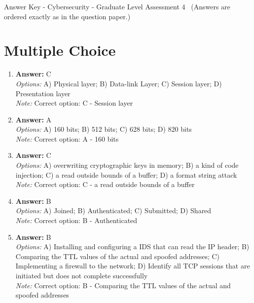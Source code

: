 \documentclass[12pt]{article}
\begin{document}
\begin{center}
Answer Key - Cybersecurity - Graduate Level Assessment 4 \
\small (Answers are ordered exactly as in the question paper.)
\end{center}

\section*{Multiple Choice}
\begin{enumerate}[label=\arabic*.]
\item \textbf{Answer:} C
\\ \textit{Options:} A) Physical layer; B) Data-link Layer; C) Session layer; D) Presentation layer
\\ \textit{Note:} Correct option: C - Session layer
\item \textbf{Answer:} A
\\ \textit{Options:} A) 160 bits; B) 512 bits; C) 628 bits; D) 820 bits
\\ \textit{Note:} Correct option: A - 160 bits
\item \textbf{Answer:} C
\\ \textit{Options:} A) overwriting cryptographic keys in memory; B) a kind of code injection; C) a read outside bounds of a buffer; D) a format string attack
\\ \textit{Note:} Correct option: C - a read outside bounds of a buffer
\item \textbf{Answer:} B
\\ \textit{Options:} A) Joined; B) Authenticated; C) Submitted; D) Shared
\\ \textit{Note:} Correct option: B - Authenticated
\item \textbf{Answer:} B
\\ \textit{Options:} A) Installing and configuring a IDS that can read the IP header; B) Comparing the TTL values of the actual and spoofed addresses; C) Implementing a firewall to the network; D) Identify all TCP sessions that are initiated but does not complete successfully
\\ \textit{Note:} Correct option: B - Comparing the TTL values of the actual and spoofed addresses
\end{enumerate}
\end{document}
